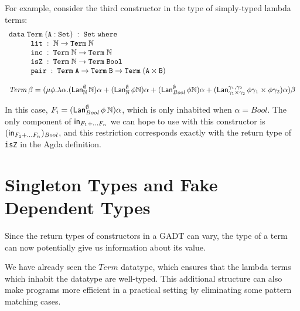 \documentclass[acmsmall,review,anonymous]{acmart}
\theoremstyle{definition}
\begin{document}
For example, consider the third constructor in
the type of simply-typed lambda terms:
\[\begin{array}{l}
  \mathtt{data\; Term\;(A : Set)\;:\;Set\;where}\\
  \hspace*{0.4in}\mathtt{lit\;:\; \mathbb{N} \rightarrow Term\;\mathbb{N}}\\
  \hspace*{0.4in}\mathtt{inc\;:\; Term\;\mathbb{N} \rightarrow Term\;\mathbb{N}}\\
  \hspace*{0.4in}\mathtt{isZ\;:\; Term\;\mathbb{N} \rightarrow Term\;Bool}\\
  \hspace*{0.4in}\mathtt{pair\;:\; Term\;A \rightarrow Term\;B \rightarrow Term\;(A \times B)} \\ \\

\mathit{Term} \, \beta = (\mu \phi. \lambda \alpha. 
  (\mathsf{Lan}^\emptyset_{\mathbb{N}} \, \mathbb{N})\alpha
+ (\mathsf{Lan}^\emptyset_{\mathbb{N}} \, \phi \mathbb{N})\alpha
+ (\mathsf{Lan}^\emptyset_{\mathit{Bool}} \, \phi \mathbb{N})\alpha
+ (\mathsf{Lan}^{\gamma_1, \gamma_2}_{\gamma_1 \times \gamma_2} \, \phi \gamma_1 \times \phi \gamma_2)\alpha)\beta
\end{array}\]

In this case, $F_i = (\mathsf{Lan}^{\emptyset}_{\mathit{Bool}} \, \phi\,\mathbb{N})\alpha$, which is only inhabited when $\alpha = \mathit{Bool}$.
The only component of $\mathsf{in}_{F_1 + ... F_n}$ we can hope to use with this constructor is $(\mathsf{in}_{F_1 + ... F_n})_\mathit{Bool}$,
and this restriction corresponds exactly with the return type of \texttt{isZ} in the Agda definition. 




\section{Singleton Types and Fake Dependent Types}
Since the return types of constructors in a GADT can vary, 
the type of a term can now potentially give us information about its value.

We have already seen the $\mathit{Term}$ datatype, which ensures that 
the lambda terms which inhabit the datatype are well-typed. This additional
structure can also make programs more efficient in a practical setting
by eliminating some pattern matching cases. 
\end{document}
